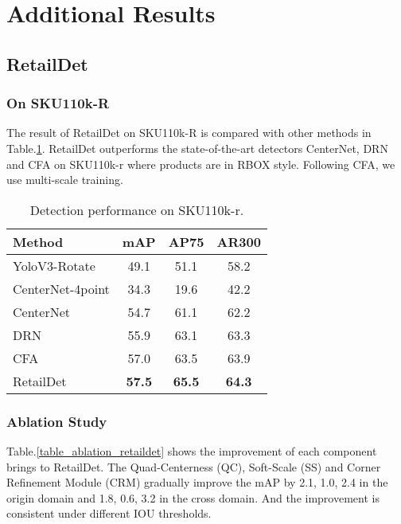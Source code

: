 \documentclass[runningheads]{llncs}
\begin{document}
\section{Additional Results}

\subsection{RetailDet}
\subsubsection{On SKU110k-R}
The result of RetailDet on SKU110k-R is compared with other methods in Table.\ref{table_sku110kr}. RetailDet outperforms the state-of-the-art detectors CenterNet\cite{xingyi2019centernet}, DRN \cite{SKU110k-r} and CFA \cite{Guo_2021_CFA} on SKU110k-r where products are in RBOX style. Following CFA, we use multi-scale training.
\begin{table}[t]
\centering
\begin{tabular}{l|ccc}
\hline \hline
Method           & mAP    & AP75    & AR300 \\ \hline
YoloV3-Rotate\cite{redmon2018yolov3}    & 49.1   & 51.1    & 58.2  \\
CenterNet-4point\cite{xingyi2019centernet} & 34.3   & 19.6    & 42.2  \\
CenterNet\cite{xingyi2019centernet}        & 54.7   & 61.1    & 62.2  \\
DRN\cite{SKU110k-r}              & 55.9   & 63.1    & 63.3  \\ 
CFA\cite{Guo_2021_CFA}              & 57.0   & 63.5    & 63.9  \\ 
RetailDet  & \textbf{57.5}   & \textbf{65.5}    & \textbf{64.3}  \\ 
\hline
\end{tabular}
\caption{Detection performance on SKU110k-r.}
\label{table_sku110kr}
\end{table}

\subsubsection{Ablation Study} Table.\ref{table_ablation_retaildet} shows the improvement of each component brings to RetailDet. The Quad-Centerness (QC), Soft-Scale (SS) and 
Corner Refinement Module (CRM) gradually improve the mAP by 2.1, 1.0, 2.4 in the origin domain and 1.8, 0.6, 3.2 in the cross domain. And the improvement is consistent under different IOU thresholds.
\end{document}
